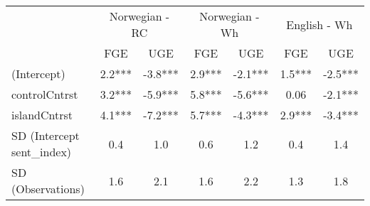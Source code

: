 \begin{longtable}{lcccccc}
\toprule
 & \multicolumn{2}{c}{Norwegian - RC} & \multicolumn{2}{c}{Norwegian - Wh} & \multicolumn{2}{c}{English - Wh} \\ 
\cmidrule(lr){2-3} \cmidrule(lr){4-5} \cmidrule(lr){6-7}
  & FGE & UGE & FGE & UGE & FGE & UGE \\ 
\midrule\addlinespace[2.5pt]
(Intercept) & 2.2*** & -3.8*** & 2.9*** & -2.1*** & 1.5*** & -2.5*** \\ 
controlCntrst & 3.2*** & -5.9*** & 5.8*** & -5.6*** & 0.06 & -2.1*** \\ 
islandCntrst & 4.1*** & -7.2*** & 5.7*** & -4.3*** & 2.9*** & -3.4*** \\ 
SD (Intercept sent\_index) & 0.4 & 1.0 & 0.6 & 1.2 & 0.4 & 1.4 \\ 
SD (Observations) & 1.6 & 2.1 & 1.6 & 2.2 & 1.3 & 1.8 \\ 
\bottomrule
\end{longtable}

